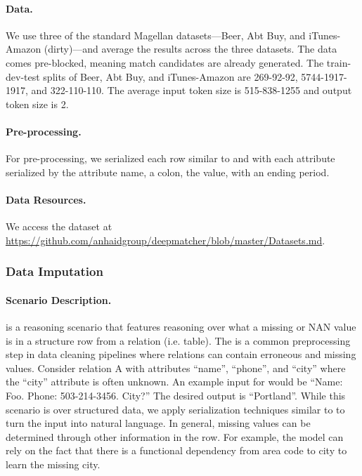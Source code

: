 \paragraph{Data.}
We use three of the standard Magellan \citep{konda2016magellan} datasets---Beer, Abt Buy, and iTunes-Amazon (dirty)---and average the results across the three datasets. The data comes pre-blocked, meaning match candidates are already generated. The train-dev-test splits of Beer, Abt Buy, and iTunes-Amazon are 269-92-92, 5744-1917-1917, and 322-110-110. The average input token size is 515-838-1255 and output token size is 2.

\paragraph{Pre-processing.}
For pre-processing, we serialized each row similar to \citet{narayan2022can} and \citet{li2020deep} with each attribute serialized by the attribute name, a colon, the value, with an ending period.

\paragraph{Data Resources.}
We access the dataset at \url{https://github.com/anhaidgroup/deepmatcher/blob/master/Datasets.md}.

\subsubsection{Data Imputation}


\paragraph{Scenario Description.}
\dataimp \citep{mei2021capturing, abedjan2016detecting} is a reasoning scenario that features reasoning over what a missing or NAN value is in a structure row from a relation (i.e. table). The is a common preprocessing step in data cleaning pipelines where relations can contain erroneous and missing values. Consider relation A with attributes ``name'', ``phone'', and ``city'' where the ``city'' attribute is often unknown. An example input for \dataimp would be ``Name: Foo. Phone: 503-214-3456. City?'' The desired output is ``Portland''. While this scenario is over structured data, we apply serialization techniques similar to \citet{narayan2022can} to turn the input into natural language. In general, missing values can be determined through other information in the row. For example, the model can rely on the fact that there is a functional dependency from area code to city to learn the missing city.

